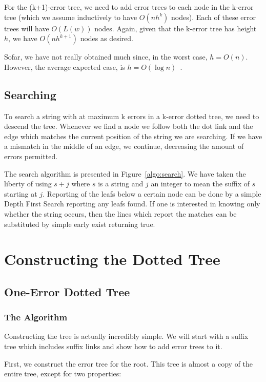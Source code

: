 \documentclass[letter,10pt]{article}
\begin{document}
For the (k+1)-error tree, we need to add error trees to each node in the k-error tree (which we assume inductively to have $O(nh^k)$ nodes). Each of these error trees will have $O(L(w))$ nodes. Again, given that the k-error tree has height $h$, we have $O(nh^{k+1})$ nodes as desired.

Sofar, we have not really obtained much since, in the worst case, $h=O(n)$. However, the average expected case, is $h=O(\log n)$~\cite{devroye:note,szpankowski:unexpected}.

\subsection{Searching}

To search a string with at maximum k errors in a k-error dotted tree, we need to descend the tree. Whenever we find a node we follow both the dot link and the edge which matches the current position of the string we are searching. If we have a mismatch in the middle of an edge, we continue, decreasing the amount of errors permitted.



The search algorithm is presented in Figure~\ref{algo:search}. We have taken the liberty of using $s+j$ where $s$ is a string and $j$ an integer to mean the suffix of $s$ starting at $j$. Reporting of the leafs below a certain node can be done by a simple Depth First Search reporting any leafs found. If one is interested in knowing only whether the string occurs, then the lines which report the matches can be substituted by simple early exist returning true.

\section{Constructing the Dotted Tree}

\subsection{One-Error Dotted Tree}
\subsubsection{The Algorithm}

Constructing the tree is actually incredibly simple. We will start with a suffix tree which includes suffix links and show how to add error trees to it.

First, we construct the error tree for the root. This tree is almost a copy of the entire tree, except for two properties:
\end{document}
